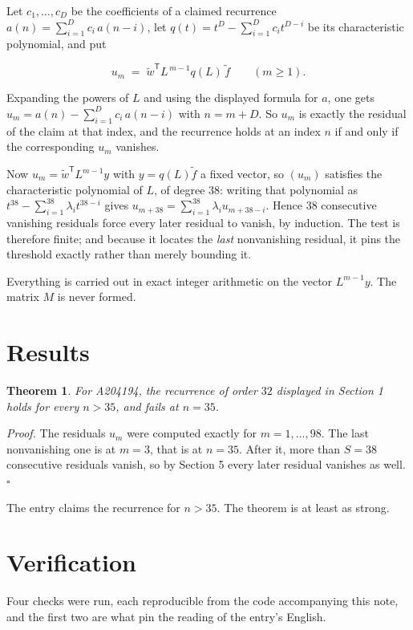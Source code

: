 \documentclass[11pt]{article}
\newtheorem{theorem}{Theorem}
\theoremstyle{definition}
\begin{document}
Let $c_1,\dots,c_D$ be the coefficients of a claimed recurrence $a(n) = \sum_{i=1}^{D} c_i\,a(n-i)$, let $q(t) = t^{D} - \sum_{i=1}^{D} c_i t^{D-i}$ be its characteristic polynomial, and put

\[u_m \;=\; \tilde w^{\mathsf T} L^{\,m-1} q(L)\,\tilde f \qquad (m \ge 1).\]

Expanding the powers of $L$ and using the displayed formula for $a$, one gets $u_m = a(n) - \sum_{i=1}^{D} c_i\,a(n-i)$ with $n = m + D$. So $u_m$ is exactly the residual of the claim at that index, and the recurrence holds at an index $n$ if and only if the corresponding $u_m$ vanishes.

Now $u_m = \tilde w^{\mathsf T} L^{m-1} y$ with $y = q(L)\tilde f$ a fixed vector, so $(u_m)$ satisfies the characteristic polynomial of $L$, of degree $38$: writing that polynomial as $t^{38} - \sum_{i=1}^{38} \lambda_i t^{38-i}$ gives $u_{m+38} = \sum_{i=1}^{38} \lambda_i u_{m+38-i}$. Hence $38$ consecutive vanishing residuals force every later residual to vanish, by induction. The test is therefore finite; and because it locates the {\itshape last} nonvanishing residual, it pins the threshold exactly rather than merely bounding it.

Everything is carried out in exact integer arithmetic on the vector $L^{m-1}y$. The matrix $M$ is never formed.

\section{Results}

\begin{theorem} For A204194, the recurrence of order $32$ displayed in Section 1 holds for every $n > 35$, and fails at $n = 35$.\end{theorem}

{\itshape Proof.} The residuals $u_m$ were computed exactly for $m = 1,\dots,98$. The last nonvanishing one is at $m = 3$, that is at $n = 35$. After it, more than $S = 38$ consecutive residuals vanish, so by Section 5 every later residual vanishes as well. $\square$

The entry claims the recurrence for $n > 35$. The theorem is at least as strong.

\section{Verification}

Four checks were run, each reproducible from the code accompanying this note, and the first two are what pin the reading of the entry's English.
\end{document}
